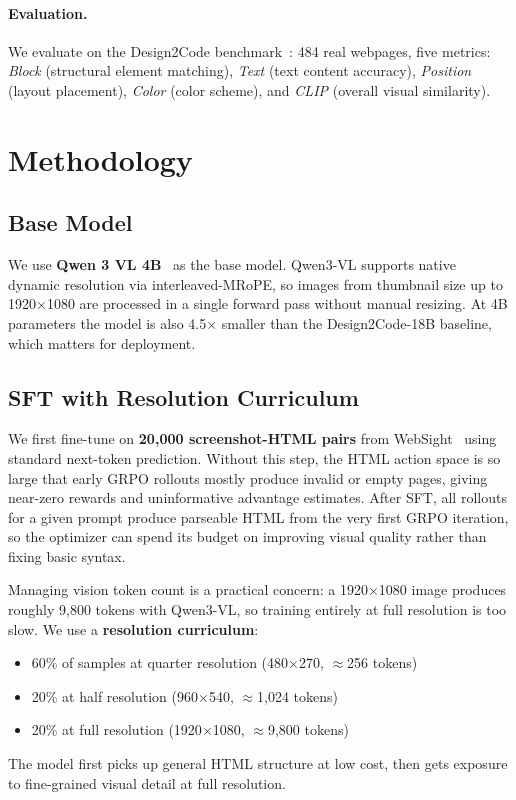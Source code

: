 \documentclass[10pt,twocolumn,letterpaper]{article}
\begin{document}
\paragraph{Evaluation.}
We evaluate on the Design2Code benchmark~\citep{si2025design2code}: 484 real
webpages, five metrics: \textit{Block} (structural element matching),
\textit{Text} (text content accuracy), \textit{Position} (layout placement),
\textit{Color} (color scheme), and \textit{CLIP} (overall visual similarity).

\section{Methodology}

\subsection{Base Model}

We use \textbf{Qwen 3 VL 4B}~\citep{qwen3vl2025} as the base model.
Qwen3-VL supports native dynamic resolution via interleaved-MRoPE, so images
from thumbnail size up to 1920$\times$1080 are processed in a single forward
pass without manual resizing.  At 4B parameters the model is also 4.5$\times$
smaller than the Design2Code-18B baseline, which matters for deployment.

\subsection{SFT with Resolution Curriculum}
\label{sec:sft}

We first fine-tune on \textbf{20{,}000 screenshot-HTML pairs} from
WebSight~\citep{huggingface2024websight} using standard next-token prediction.
Without this step, the HTML action space is so large that early GRPO rollouts
mostly produce invalid or empty pages, giving near-zero rewards and uninformative
advantage estimates.  After SFT, all rollouts for a given prompt produce
parseable HTML from the very first GRPO iteration, so the optimizer can spend
its budget on improving visual quality rather than fixing basic syntax.

Managing vision token count is a practical concern: a 1920$\times$1080 image
produces roughly 9{,}800 tokens with Qwen3-VL, so training entirely at full
resolution is too slow.  We use a \textbf{resolution curriculum}:
\begin{itemize}[leftmargin=1.2em,itemsep=1pt,topsep=2pt]
  \item 60\% of samples at quarter resolution (480$\times$270, $\approx$256 tokens)
  \item 20\% at half resolution (960$\times$540, $\approx$1{,}024 tokens)
  \item 20\% at full resolution (1920$\times$1080, $\approx$9{,}800 tokens)
\end{itemize}
The model first picks up general HTML structure at low cost, then gets exposure
to fine-grained visual detail at full resolution.
\end{document}
